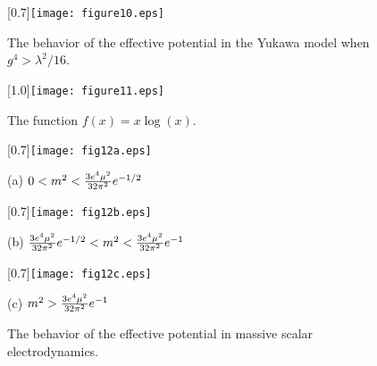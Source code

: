 \documentclass[12pt,epsf]{report}
\begin{document}
\begin{figure}[ht]
\begin{center}
\scalebox{0.9}[0.7]{\texttt{[image: figure10.eps]}}
\par
\vskip-2.0cm{}
\end{center}
\begin{quote}
\caption{\small The behavior of the effective potential in the 
Yukawa model when $g^4 > \lambda^2/16$.   }
\end{quote}
\end{figure}


\begin{figure}[ht]
\begin{center}
\scalebox{1.0}[1.0]{\texttt{[image: figure11.eps]}}
\par
\vskip-2.0cm{}
\end{center}
\begin{quote}
\caption{\small The function $f(x) = x \log(x)$.  }
\end{quote}
\end{figure}

\clearpage

\begin{figure}[t]
\begin{center}
\scalebox{0.9}[0.7]{\texttt{[image: fig12a.eps]}}
\par
\end{center}
\begin{center}
{(a) $0 < m^2 < {3e^4 \mu^2 \over 32\pi^2}
e^{-1/2}$  }
\end{center}

\begin{center}
\scalebox{0.9}[0.7]{\texttt{[image: fig12b.eps]}}
\par
\end{center}
\begin{center}
{ (b) ${3e^4 \mu^2 \over 32\pi^2}e^{-1/2}
 <m^2 < {3e^4 \mu^2 \over 32\pi^2}e^{-1}$}
\end{center}

\begin{center}
\scalebox{0.9}[0.7]{\texttt{[image: fig12c.eps]}}
\par
\end{center}
\begin{center}
{ (c) $m^2 > {3e^4 \mu^2 \over 32\pi^2}e^{-1}$}
\end{center}
\begin{quote}
\caption{\small The behavior of the effective potential in massive
scalar electrodynamics. }

\end{quote}
\end{figure}
\end{document}
